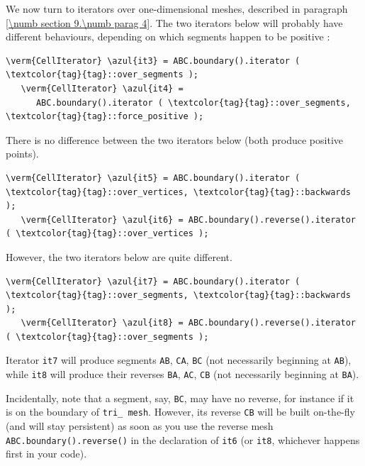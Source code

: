 We now turn to iterators over one-dimensional meshes, described in paragraph
\ref{\numb section 9.\numb parag 4}.
The two iterators below will probably have different behaviours,
depending on which segments happen to be positive :

\begin{Verbatim}[commandchars=\\\{\},formatcom=\small\tt,
   baselinestretch=0.94,framesep=2mm                      ]
   \verm{CellIterator} \azul{it3} = ABC.boundary().iterator ( \textcolor{tag}{tag}::over_segments );
   \verm{CellIterator} \azul{it4} =
      ABC.boundary().iterator ( \textcolor{tag}{tag}::over_segments, \textcolor{tag}{tag}::force_positive );
\end{Verbatim}

There is no difference between the two iterators below (both produce positive
points).

\begin{Verbatim}[commandchars=\\\{\},formatcom=\small\tt,
   baselinestretch=0.94,framesep=2mm                      ]
   \verm{CellIterator} \azul{it5} = ABC.boundary().iterator ( \textcolor{tag}{tag}::over_vertices, \textcolor{tag}{tag}::backwards );
   \verm{CellIterator} \azul{it6} = ABC.boundary().reverse().iterator ( \textcolor{tag}{tag}::over_vertices );
\end{Verbatim}

However, the two iterators below are quite different.

\begin{Verbatim}[commandchars=\\\{\},formatcom=\small\tt,
   baselinestretch=0.94,framesep=2mm                      ]
   \verm{CellIterator} \azul{it7} = ABC.boundary().iterator ( \textcolor{tag}{tag}::over_segments, \textcolor{tag}{tag}::backwards );
   \verm{CellIterator} \azul{it8} = ABC.boundary().reverse().iterator ( \textcolor{tag}{tag}::over_segments );
\end{Verbatim}

Iterator {\small\tt it7} will produce segments {\small\tt AB}, {\small\tt CA}, {\small\tt BC}
(not necessarily beginning at {\small\tt AB}), while {\small\tt it8} will produce their reverses
{\small\tt BA}, {\small\tt AC}, {\small\tt CB} (not necessarily beginning at {\small\tt BA}).

Incidentally, note that a segment, say, {\small\tt BC}, may have no reverse,
for instance if it is on the boundary of {\small\tt tri\_\,mesh}.
However, its reverse {\small\tt CB} will be built on-the-fly (and will stay persistent)
as soon as you use the reverse mesh {\small\tt ABC.boundary().reverse()} in the declaration of
{\small\tt it6} (or {\small\tt it8}, whichever happens first in your code).


